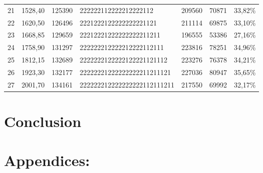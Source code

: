 \documentclass[preprint,12pt]{elsarticle}
\begin{document}
\begin{table}[htbp]
\begin{tabular}{rrrlrrr}
    21    & 1528,40 & 125390 & 222222112222212222112  & 209560 & 70871 & 33,82\% \\
    22    & 1620,50 & 126496 & 2221222122222222221121  & 211114 & 69875 & 33,10\% \\
    23    & 1668,85 & 129659 & 22212221222222222211211  & 196555 & 53386 & 27,16\% \\
    24    & 1758,90 & 131297 & 222222212222212222112111  & 223816 & 78251 & 34,96\% \\
    25    & 1812,15 & 132689 & 2222222122222122221121112 & 223276 & 76378 & 34,21\% \\
    26    & 1923,30 & 132177 & 22222221222222222211211121  & 227036 & 80947 & 35,65\% \\
    27    & 2001,70 & 134161 & 222222212222222222112111211 & 217550 & 69992 & 32,17\% \\
    \bottomrule
    \end{tabular}%
  \label{tab:addlabel}%
\end{table}%

\section{Conclusion}

\section{Appendices:}
\appendix
\end{document}
